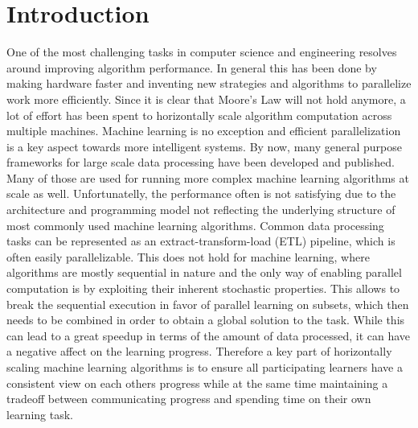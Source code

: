 
\chapter{Introduction}
One of the most challenging tasks in computer science and engineering resolves around improving algorithm performance.
In general this has been done by making hardware faster and inventing new strategies and algorithms to parallelize work more efficiently.
Since it is clear that Moore's Law will not hold anymore, a lot of effort has been spent to horizontally scale algorithm computation across multiple machines.
Machine learning is no exception and efficient parallelization is a key aspect towards more intelligent systems.
By now, many general purpose frameworks for large scale data processing have been developed and published. Many of those are used for running more complex machine learning algorithms at scale as well.
Unfortunatelly, the performance often is not satisfying due to the architecture and programming model not reflecting the underlying structure of most commonly used machine learning algorithms.
Common data processing tasks can be represented as an extract-transform-load (ETL) pipeline, which is often easily parallelizable. This does not hold for machine learning, where algorithms are mostly sequential in nature and the only way of enabling parallel computation is by exploiting their inherent stochastic properties. This allows to break the sequential execution in favor of parallel learning on subsets, which then needs to be combined in order to obtain a global solution to the task.
While this can lead to a great speedup in terms of the amount of data processed, it can have a negative affect on the learning progress.
Therefore a key part of horizontally scaling machine learning algorithms is to ensure all participating learners have a consistent view on each others progress while at the same time maintaining a tradeoff between communicating progress and spending time on their own learning task.


